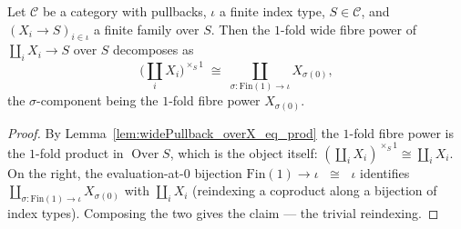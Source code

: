 \begin{lemma}

  \label{lem:coproduct_distrib_fibrePower_zero}
  Let \(\mathcal{C}\) be a category with pullbacks, \(\iota\) a finite index type, \(S \in
  \mathcal{C}\), and \((X_i \to S)_{i \in \iota}\) a finite family over \(S\). Then the \(1\)-fold
  wide fibre power of \(\coprod_i X_i \to S\) over \(S\) decomposes as
  \[
    \bigl(\textstyle\coprod_{i} X_i\bigr)^{\times_S 1}
      \;\cong\;
    \coprod_{\sigma : \mathrm{Fin}(1) \to \iota} X_{\sigma(0)},
  \]
  the \(\sigma\)-component being the \(1\)-fold fibre power \(X_{\sigma(0)}\).
\end{lemma}
\begin{proof}
  \leanok
  By Lemma~\ref{lem:widePullback_overX_eq_prod} the \(1\)-fold fibre power is the \(1\)-fold product
  in \(\operatorname{Over} S\), which is the object itself: \((\coprod_i X_i)^{\times_S 1} \cong
  \coprod_i X_i\). On the right, the evaluation-at-\(0\) bijection \(\mathrm{Fin}(1) \to \iota\)
  \(\;\cong\;\) \(\iota\) identifies \(\coprod_{\sigma : \mathrm{Fin}(1)\to\iota} X_{\sigma(0)}\)
  with \(\coprod_i X_i\) (reindexing a coproduct along a bijection of index types). Composing the
  two gives the claim --- the trivial reindexing.
\end{proof}

